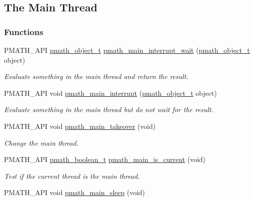 \hypertarget{group__mainthread}{
\subsection{The Main Thread}
\label{group__mainthread}
}
\subsubsection*{Functions}
\begin{CompactItemize}
\item 
PMATH\_\-API \hyperlink{classpmath__object__t}{pmath\_\-object\_\-t} \hyperlink{group__mainthread_gff368341b3f162100031fffb986bcb48}{pmath\_\-main\_\-interrupt\_\-wait} (\hyperlink{classpmath__object__t}{pmath\_\-object\_\-t} object)
\begin{CompactList}\small\item\em Evaluate something in the main thread and return the result. \item\end{CompactList}\item 
PMATH\_\-API void \hyperlink{group__mainthread_g3514921bc9c7fcf88513abe999689d8b}{pmath\_\-main\_\-interrupt} (\hyperlink{classpmath__object__t}{pmath\_\-object\_\-t} object)
\begin{CompactList}\small\item\em Evaluate something in the main thread but do not wait for the result. \item\end{CompactList}\item 
PMATH\_\-API void \hyperlink{group__mainthread_g0252e2ab998fdee2fd3e5a8a96b3ef77}{pmath\_\-main\_\-takeover} (void)
\begin{CompactList}\small\item\em Change the main thread. \item\end{CompactList}\item 
PMATH\_\-API \hyperlink{group__general__types_g8e45b3972d0a6a89b2b45eb9eae6d8f7}{pmath\_\-boolean\_\-t} \hyperlink{group__mainthread_g92ca1b4bc94f99370d5397d6db61a729}{pmath\_\-main\_\-is\_\-current} (void)
\begin{CompactList}\small\item\em Test if the current thread is the main thread. \item\end{CompactList}\item 
PMATH\_\-API void \hyperlink{group__mainthread_gbf65d599bb8f32c96d0a0d6ff14bf858}{pmath\_\-main\_\-sleep} (void)

\end{CompactItemize}
